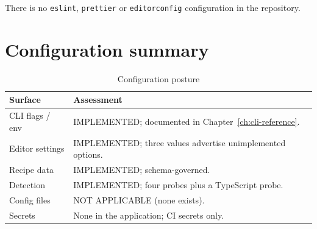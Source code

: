 There is no \texttt{eslint}, \texttt{prettier} or \texttt{editorconfig}
configuration in the repository.

\section{Configuration summary}

\begin{table}[H]
\centering
\caption{Configuration posture}
\begin{tabular}{p{4.4cm}p{9.8cm}}
\toprule
\textbf{Surface} & \textbf{Assessment} \\
\midrule
CLI flags / env & IMPLEMENTED; documented in Chapter~\ref{ch:cli-reference}. \\
Editor settings & IMPLEMENTED; three values advertise unimplemented options. \\
Recipe data & IMPLEMENTED; schema-governed. \\
Detection & IMPLEMENTED; four probes plus a TypeScript probe. \\
Config files & NOT APPLICABLE (none exists). \\
Secrets & None in the application; CI secrets only. \\
\bottomrule
\end{tabular}
\end{table}
